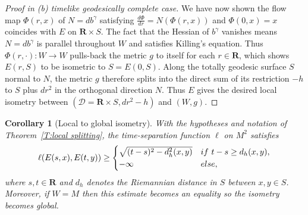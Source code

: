 \documentclass[12pt]{amsart}
\newcommand{\R}{{\mathbf R}}
\newcommand{\re}{\color{red}}
\newtheorem{corollary}[theorem]{Corollary}
\begin{document}
\begin{proof}[Proof in {(b) timelike geodesically complete} case]
We have now shown the flow map $\Phi(r,x)$ 
of $N=db^\gamma$ satisfying $\frac{d\Phi}{dr} = N(\Phi(r,x))$ and $\Phi(0,x)=x$ 
coincides with $E$ on $\R \times S$.
The fact that the Hessian of $b^\gamma$ vanishes  means $N=db^\gamma$ is parallel throughout $W$ and satisfies Killing's equation.
Thus $\Phi(r,\cdot):W \longrightarrow W$ pulls-back the metric $g$ %
to itself for each $r \in \R$, which shows $E(r,S)$ to be isometric to $S=E(0,S)$.
Along the totally geodesic surface $S$ normal to $N$,  the metric $g$ therefore splits into the direct sum of its restriction $-h$ to $S$ plus $dr^2$ in the orthogonal direction $N$.  Thus $E$
gives the desired local isometry between 
$(\mathcal{D}=\R\times S, dr^2-h)$ and $(W,g)$.
\end{proof}


\begin{corollary}[Local to global isometry]\label{C:local splitting}
With the hypotheses and notation of Theorem~\ref{T:local splitting}, the time-separation function $\ell$ on $M^2$ satisfies
\begin{equation}\label{local to global}
\ell(E(s,x),E(t,y)) \ge 
\begin{cases}
\sqrt{(t-s)^2 - d^2_h(x,y)} & {\rm if}\ t-s \ge d_h(x,y),
\\ -\infty & {\rm else},
\end{cases}
\end{equation}
where $s,t \in\R$ and $d_h$ denotes the Riemannian distance in $S$ between $x,y \in S$.  Moreover, if $W=M$ then this estimate becomes an equality so the isometry becomes global.
\end{corollary}
\end{document}
